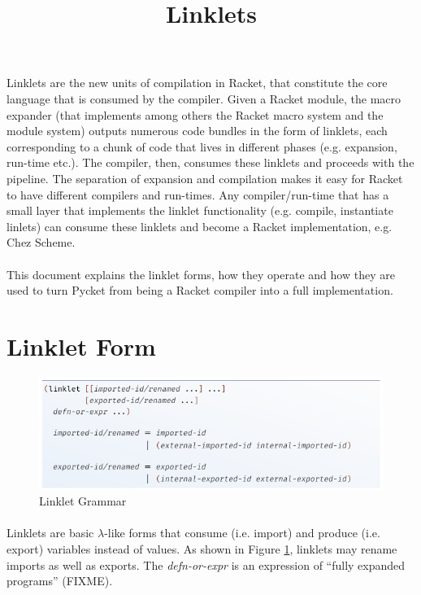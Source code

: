 \documentclass[a4paper]{article}
\title{Linklets}
\author{}
\date{}
\begin{document}
\maketitle

\paragraph{} Linklets are the new units of compilation in Racket, that
constitute the core language that is consumed by the compiler. Given a
Racket module, the macro expander (that implements among others the
Racket macro system and the module system) outputs numerous code
bundles in the form of linklets, each corresponding to a chunk of code
that lives in different phases (e.g. expansion, run-time etc.). The
compiler, then, consumes these linklets and proceeds with the
pipeline. The separation of expansion and compilation makes it easy
for Racket to have different compilers and run-times. Any
compiler/run-time that has a small layer that implements the linklet
functionality (e.g. compile, instantiate linlets) can consume these
linklets and become a Racket implementation, e.g. Chez Scheme.
\cite{racketcs-icfp-2019}

\paragraph{} This document explains the linklet forms, how they
operate and how they are used to turn Pycket from being a Racket
compiler into a full implementation.

\section{Linklet Form}

\begin{figure}[h!]
\includegraphics[scale=0.5]{img/linklet-grammar.png}
\caption{Linklet Grammar}
\label{fig:linklet-grammar}
\end{figure}


\paragraph{} Linklets are basic $\lambda$-like forms that consume
(i.e. import) and produce (i.e. export) variables instead of
values. As shown in Figure \ref{fig:linklet-grammar}, linklets may
rename imports as well as exports. The \emph{defn-or-expr} is an
expression of ``fully expanded programs'' (FIXME).
\end{document}
